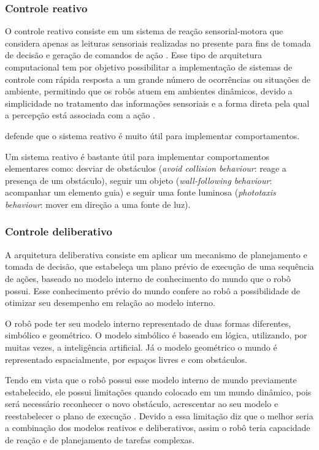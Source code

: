 \subsubsection{Controle reativo}
O controle reativo consiste em um sistema de reação sensorial-motora que considera apenas as leituras sensoriais realizadas no presente para fins de tomada de decisão e geração de comandos de ação \cite{wolf2009robotica}. Esse tipo de arquitetura computacional tem por objetivo possibilitar a implementação de sistemas de controle com rápida resposta a um grande número de ocorrências ou situações de ambiente, permitindo que os robôs atuem em ambientes dinâmicos, devido a simplicidade no tratamento das informações sensoriais e a forma direta pela qual a percepção está associada com a ação . 

	\cite{wolf2009robotica} defende que o sistema reativo é muito útil para implementar comportamentos.
\begin{citacao}
Um sistema reativo é bastante útil para implementar comportamentos elementares como: desviar de obstáculos (\textit{avoid collision behaviour}: reage a presença de um obstáculo), seguir um objeto (\textit{wall-following behaviour}: acompanhar um elemento guia) e seguir uma fonte luminosa (\textit{phototaxis behaviour}: mover em direção a uma fonte de luz). 
\end{citacao}

\subsubsection{Controle deliberativo}
A arquitetura deliberativa consiste em aplicar um mecanismo de planejamento e tomada de decisão, que estabeleça um plano prévio de execução de uma sequência de ações, baseado no modelo interno de conhecimento do mundo que o robô possui. Esse conhecimento prévio do mundo confere ao robô a possibilidade de otimizar seu desempenho em relação ao modelo interno. 

O robô pode ter seu modelo interno representado de duas formas diferentes, simbólico e geométrico. O modelo simbólico é baseado em lógica, utilizando, por muitas vezes, a inteligência artificial. Já o modelo geométrico o mundo é representado espacialmente, por espaços livres e com obstáculos. \cite{industriais2009sistema}

Tendo em vista que o robô possui esse modelo interno de mundo previamente estabelecido, ele possui limitações quando colocado em um mundo dinâmico, pois será necessário reconhecer o novo obstáculo, acrescentar ao seu modelo e reestabelecer o plano de execução \cite{industriais2009sistema}. Devido a essa limitação \cite{wolf2009robotica} diz que o melhor seria a combinação dos modelos reativos e deliberativos, assim o robô teria capacidade de reação e de planejamento de tarefas complexas. 

